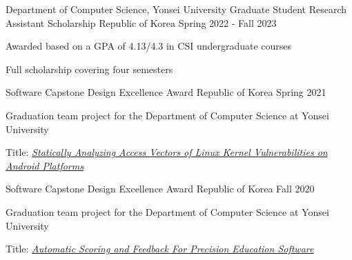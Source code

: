 

\begin{cventries}

  \cventry
    {Department of Computer Science, Yonsei University} %
    {Graduate Student Research Assistant Scholarship} %
    {Republic of Korea} %
    {Spring 2022 - Fall 2023} %
    {
      \begin{cvitems} %
        \item {Awarded based on a GPA of 4.13/4.3 in CSI undergraduate courses}
        \item {Full scholarship covering four semesters}
      \end{cvitems}
    }

  \cventry
    {Software Capstone Design} %
    {Excellence Award} %
    {Republic of Korea} %
    {Spring 2021} %
    {
      \begin{cvitems}
        \item {Graduation team project for the Department of Computer Science at Yonsei University}
        \item {Title: \href{https://drive.google.com/file/d/1RgZgifnHedxJ21c6xtl_vPQS3rqL6xff/view?usp=sharing}{\textit{Statically Analyzing Access Vectors of Linux Kernel Vulnerabilities on Android Platforms}}}
      \end{cvitems}
    }

  \cventry
    {Software Capstone Design} %
    {Excellence Award} %
    {Republic of Korea} %
    {Fall 2020} %
    {
      \begin{cvitems}
        \item {Graduation team project for the Department of Computer Science at Yonsei University}
        \item {Title: \href{https://docs.google.com/document/d/14OhRL9QE26p47pvKkOurn-uUZJICLSA1G2RVAD_P13c/edit?usp=sharing}{\textit{Automatic Scoring and Feedback For Precision Education Software}}}
      \end{cvitems}
    }

\end{cventries}
